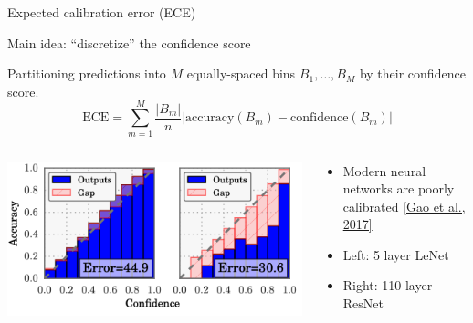 \documentclass[usenames,dvipsnames,notes,11pt,aspectratio=169,hyperref={colorlinks=true, linkcolor=blue}]{beamer}
\begin{document}
\begin{frame}
    {Expected calibration error (ECE) \mycite{[Naeini et al., 2015]}} 

    Main idea: ``discretize'' the confidence score

    Partitioning predictions into $M$ equally-spaced bins $B_1,\ldots, B_M$ by their confidence score.\pause
    $$
    \text{ECE} = \sum_{m=1}^M \frac{|B_m|}{n}
    \left \vert\text{accuracy}(B_m) - \text{confidence}(B_m)\right\vert 
    $$

    \begin{columns}
        \begin{column}{0.5\textwidth}
            \includegraphics[width=\textwidth]{figures/nn-calibration}
        \end{column}
        \begin{column}{0.5\textwidth}
            \begin{itemize}
                \item Modern neural networks are poorly calibrated \href{https://arxiv.org/pdf/1706.04599.pdf}{[Gao et al., 2017]}
                \item Left: 5 layer LeNet
                \item Right: 110 layer ResNet
            \end{itemize}
        \end{column}
    \end{columns}
\end{frame}
\end{document}
